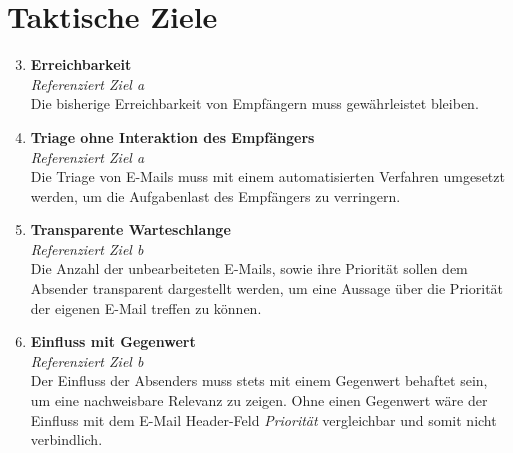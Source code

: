 \section{Taktische Ziele}
\begin{enumerate}[label=(\alph*)]
\setcounter{enumi}{2}
    \item \textbf{Erreichbarkeit}\\
    \textit{Referenziert Ziel a} \\
        Die bisherige Erreichbarkeit von Empfängern muss gewährleistet bleiben.
        
    \item \textbf{Triage ohne Interaktion des Empfängers}\\
    \textit{Referenziert Ziel a} \\
        Die Triage von E-Mails muss mit einem automatisierten Verfahren umgesetzt werden, um die Aufgabenlast des Empfängers zu verringern.
        
    \item \textbf{Transparente Warteschlange}\\
    \textit{Referenziert Ziel b} \\
        Die Anzahl der unbearbeiteten E-Mails, sowie ihre Priorität sollen dem Absender transparent dargestellt werden, um eine Aussage über die Priorität der eigenen E-Mail treffen zu können.
    
    \newpage
    
    \item \textbf{Einfluss mit Gegenwert}\\
    \textit{Referenziert Ziel b} \\
        Der Einfluss der Absenders muss stets mit einem Gegenwert behaftet sein, um eine nachweisbare Relevanz zu zeigen. Ohne einen Gegenwert wäre der Einfluss mit dem E-Mail Header-Feld \textit{Priorität} vergleichbar und somit nicht verbindlich.
\end{enumerate}


